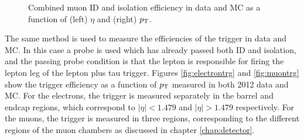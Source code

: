 \begin{figure}[htb]
\caption[Combined muon ID and isolation efficiency in data and MC as a function
of (left) $\eta$ and (right) $\pt$.]
{Combined muon ID and isolation efficiency in data and \ac{MC} as a function
of (left) $\eta$ and (right) $\pt$.}
\label{fig:muonIdIso}
\end{figure}

The same method is used to measure the efficiencies of the trigger
in data and \ac{MC}. In this case a probe is used which has already passed both ID
and isolation, and the passing probe condition is that the lepton is responsible
for firing the lepton leg of the lepton plus tau trigger. Figures
\ref{fig:electrontrg} and \ref{fig:muontrg} show the trigger efficiency as a
function of $\pt$ measured in both 2012 data and \ac{MC}. For the
electrons, the trigger is measured separately in the barrel and endcap
regions, which correspond to $|\eta| < 1.479$ and $|\eta| > 1.479$
respectively. For the muons, the trigger is measured in three regions, corresponding
to the different regions of the muon chambers as discussed in chapter
\ref{chap:detector}.

